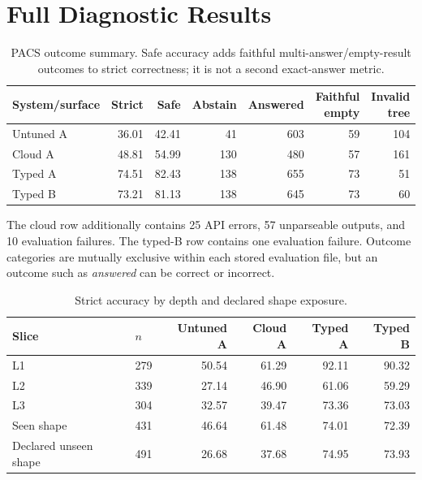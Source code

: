 \section{Full Diagnostic Results}
\label{app:full-results}

\begin{table}[h]
  \caption{PACS outcome summary.  Safe accuracy adds faithful multi-answer/empty-result outcomes
  to strict correctness; it is not a second exact-answer metric.}
  \centering
  \scriptsize
  \begin{tabular}{lrrrrrr}
    \toprule
    System/surface & Strict & Safe & Abstain & Answered & Faithful empty & Invalid tree \\
    \midrule
    Untuned A & 36.01 & 42.41 & 41 & 603 & 59 & 104 \\
    Cloud A & 48.81 & 54.99 & 130 & 480 & 57 & 161 \\
    Typed A & 74.51 & 82.43 & 138 & 655 & 73 & 51 \\
    Typed B & 73.21 & 81.13 & 138 & 645 & 73 & 60 \\
    \bottomrule
  \end{tabular}
\end{table}

The cloud row additionally contains 25 API errors, 57 unparseable outputs, and 10 evaluation
failures.  The typed-B row contains one evaluation failure.  Outcome categories are mutually
exclusive within each stored evaluation file, but an outcome such as \emph{answered} can be
correct or incorrect.

\begin{table}[h]
  \caption{Strict accuracy by depth and declared shape exposure.}
  \centering
  \scriptsize
  \begin{tabular}{llrrrr}
    \toprule
    Slice & $n$ & Untuned A & Cloud A & Typed A & Typed B \\
    \midrule
    L1 & 279 & 50.54 & 61.29 & 92.11 & 90.32 \\
    L2 & 339 & 27.14 & 46.90 & 61.06 & 59.29 \\
    L3 & 304 & 32.57 & 39.47 & 73.36 & 73.03 \\
    Seen shape & 431 & 46.64 & 61.48 & 74.01 & 72.39 \\
    Declared unseen shape & 491 & 26.68 & 37.68 & 74.95 & 73.93 \\
    \bottomrule
  \end{tabular}
\end{table}

